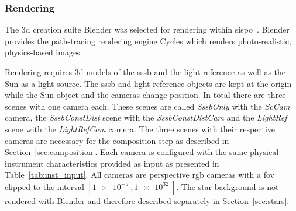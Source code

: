 \begin{table}[htb]
    \centering
    \caption{Input parameters that define the propagation step.}
    \label{tab:sim_prop_input}
\end{table}


\subsubsection{Rendering}
The \gls{3d} creation suite Blender was selected for rendering within \gls{sispo}~\cite{blender}. Blender provides the path-tracing rendering engine Cycles which renders photo-realistic, physics-based images~\cite{Cycles}.

Rendering requires \gls{3d} models of the \gls{sssb} and the light reference as well as the Sun as a light source. The \gls{sssb} and light reference objects are kept at the origin while the Sun object and the cameras change position. In total there are three scenes with one camera each. These scenes are called \textit{SssbOnly} with the \textit{ScCam} camera, the \textit{SssbConstDist} scene with the \textit{SssbConstDistCam} and the \textit{LightRef} scene with the \textit{LightRefCam} camera. The three scenes with their respective cameras are necessary for the composition step as described in Section~\ref{sec:composition}. Each camera is configured with the same physical instrument characteristics provided as input as presented in Table~\ref{tab:inst_input}. All cameras are perspective \gls{rgb} cameras with a \gls{fov} clipped to the interval $[\SI{1e-5}{},\SI{1e32}{}]$. The star background is not rendered with Blender and therefore described separately in Section~\ref{sec:stars}.

